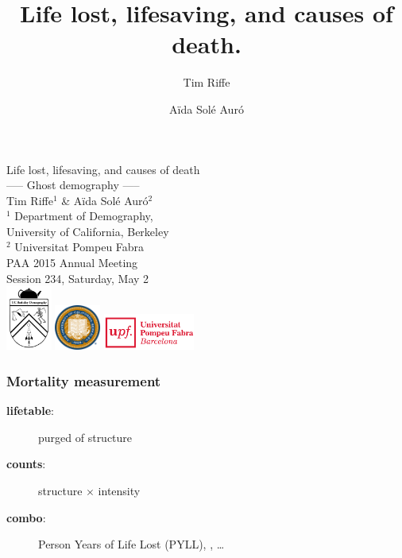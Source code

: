 \documentclass{beamer}
\title[Years Lost]{Life lost, lifesaving, and causes of death.}
\author[Riffe \& Sol\'{e}]
{
Tim Riffe \inst{1} \and A{\"i}da Sol\'{e} Aur\'{o} \inst{2}}
\institute %
{
  \inst{1}%
  Department of Demography, \\
  University of California, Berkeley \\
  \and
  \inst{2} Universitat Pompeu Fabra
}
\begin{document}

\begin{frame}[plain]

\vspace{3em}
\LARGE Life lost, lifesaving, and causes of death\\
----- Ghost demography -----
\\
\vspace{3 mm}
\normalsize Tim Riffe$^1$ \& A{\"i}da Sol\'{e} Aur\'{o}$^2$\\
\vspace{3 mm}
 $^1$ Department of Demography, \\
  \hspace{2mm} University of California, Berkeley \\
  $^2$ Universitat Pompeu Fabra\\
  \vspace{5 mm}
  PAA 2015 Annual Meeting \\
  Session 234, Saturday, May 2\\
  \vspace{5 mm}
  \includegraphics[width=1.5cm]{Figures/demogcrest}\hspace{.5cm}
  \includegraphics[width=1.5cm]{Figures/ucbseal1}\hspace{3cm}
  \includegraphics[height=1.2cm]{Figures/UPFcmyk}
\end{frame}


\begin{frame}
\frametitle{Mortality measurement}
\begin{description}
\item[\textbf{lifetable}:] purged of structure
\item[\textbf{counts}:] structure $\times$ intensity
\item[\textbf{combo}:] Person Years of Life Lost (PYLL),
\underline{\hspace{1cm}},
\ldots
\end{description}

\end{frame}
\end{document}
